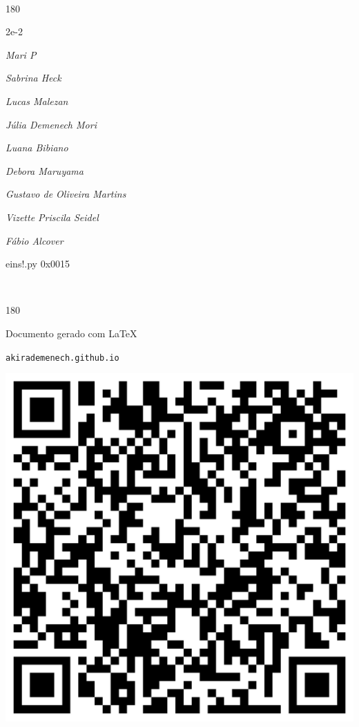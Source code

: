 \documentclass[12pt]{article}
\begin{document}
	\ 
	\vfill
	\begin{turn}{180}	
		\begin{minipage}{\textwidth}
		  	\ttfamily %
			\centering
			{\Huge 2e-2}
		  
			\hfill
		  
			

\textit{\small Mari P}

\textit{\small Sabrina Heck}

\textit{\small Lucas Malezan}

\textit{\small Júlia Demenech Mori}

\textit{\small Luana Bibiano}

\textit{\small Debora Maruyama}

\textit{\small Gustavo de Oliveira Martins}

\textit{\small Vizette Priscila Seidel}

\textit{\small Fábio Alcover}

\bigskip

eins!.py
0x0015


		\end{minipage}	
	\end{turn}
	\vfill
	\

\pagebreak

	\begin{turn}{180}	
		\begin{minipage}{\textwidth}		  
		  Documento gerado com \LaTeX			
		  
		  \texttt{akirademenech.github.io}

		  \includegraphics[height=0.3\textheight]{2e-2.pdf}

		\end{minipage}	
	\end{turn}  
		  
\end{document}

